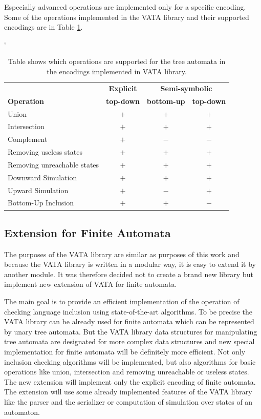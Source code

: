 Especially advanced operations are implemented only for a specific encoding. Some of the operations implemented in the VATA library and their 
supported encodings are in Table \ref{tabOp}.
\begin{savenotes}
\begin{table}[h]
	\begin{center}
		\catcode`
		\begin{tabular}{| l | c | c | c |} \hline
		& {\textbf{Explicit}} & \multicolumn{2}{|c|}{\textbf{Semi-symbolic}} \\ \cline{2-4}
		\textbf{Operation} & \textbf{top-down} & \textbf{bottom-up} & \textbf{top-down} \\ \hline
		Union & $+$ & $+$ & $+$ \\
		Intersection & $+$ & $+$ & $+$ \\
		Complement & $+$ & $-$ & $-$ \\
		Removing useless states & $+$ & $+$ & $+$ \\
		Removing unreachable states & $+$ & $+$ & $+$ \\
		Downward Simulation & $+$ & $+$ & $+$ \\
		Upward Simulation & $+$ & $-$ & $+$ \\
		Bottom-Up Inclusion  & $+$ & $+$ & $-$ \\ 
		\end{tabular}
	\caption{Table shows which operations are supported for the tree automata in the encodings implemented in VATA library.}
	\label{tabOp}
	\end{center}
\end{table}
\end{savenotes}


\subsection{Extension for Finite Automata}
The purposes of the VATA library are similar as purposes of this work and because the VATA library is written in a modular way, it is easy 
to extend it by another module. It was therefore decided not to create a brand new library but implement new extension of VATA for finite automata.

The main goal is to provide an efficient implementation of the operation of checking language inclusion using state-of-the-art algorithms. 
To be precise the VATA library can be already used for finite automata which can be represented by unary
tree automata. But the VATA library data structures for manipulating tree automata are designated for more complex data structures
and new special implementation for finite automata will be definitely more efficient. 
Not only inclusion checking algorithms will be implemented, but also algorithms for basic operations like union, intersection and removing unreachable or 
useless states. The new extension will implement only the explicit encoding of finite automata. 
The extension will use some already implemented features of the VATA library like the parser and the serializer 
or computation of simulation over states of an automaton.

